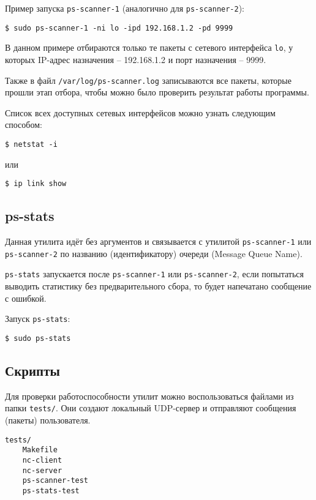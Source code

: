 \newpage

Пример запуска \verb|ps-scanner-1| (аналогично для \verb|ps-scanner-2|):
\begin{lstlisting}
$ sudo ps-scanner-1 -ni lo -ipd 192.168.1.2 -pd 9999
\end{lstlisting}
В данном примере отбираются только те пакеты с сетевого интерфейса \verb|lo|, у которых IP-адрес назначения -- 192.168.1.2 и порт назначения -- 9999.

\linespace

Также в файл \verb|/var/log/ps-scanner.log| записываются все пакеты, которые прошли этап отбора, чтобы можно было проверить результат работы программы.

\linespace

Список всех доступных сетевых интерфейсов можно узнать следующим способом:
\begin{lstlisting}
$ netstat -i
\end{lstlisting}
или
\begin{lstlisting}
$ ip link show
\end{lstlisting}

\subsection{ps-stats}

Данная утилита идёт без аргументов и связывается с утилитой \verb|ps-scanner-1| или \verb|ps-scanner-2| по названию (идентификатору) очереди (Message Queue Name).

\verb|ps-stats| запускается после \verb|ps-scanner-1| или \verb|ps-scanner-2|, если попытаться выводить статистику без предварительного сбора, то будет напечатано сообщение с ошибкой.

\linespace

Запуск \verb|ps-stats|:
\begin{lstlisting}
$ sudo ps-stats
\end{lstlisting}

\newpage

\subsection{Скрипты}

Для проверки работоспособности утилит можно воспользоваться файлами из папки \verb|tests/|. Они создают локальный UDP-сервер и отправляют сообщения (пакеты) пользователя.

\begin{lstlisting}
tests/
    Makefile
    nc-client
    nc-server
    ps-scanner-test
    ps-stats-test
\end{lstlisting}

